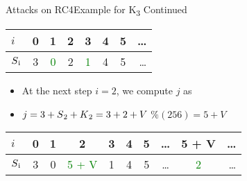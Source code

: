 \documentclass[
	aspectratio=169,	%
	onlytextwidth,		%
	t,					%
	]{beamer}
\begin{document}
\begin{frame}[fragile]{Attacks on RC4}{Example for K\textsubscript{3} Continued}

	\begin{table}[h!]
		\begin{center}
			\begin{tabular}{l|c|c|c|c|c|c|r}
			$i$ & 0 & 1 & 2 & 3 & 4 & 5 & \dots\\
			\hline
			$S\textsubscript{i}$ & 3 & \textcolor{green}{0} & 2 & \textcolor{green}{1} & 4 & 5 & \dots\\
			\end{tabular}
		\end{center}
	\end{table}

	\begin{itemize}
		\item At the next step $i = 2$, we compute $j$ as
		\item $j = 3 + S\textsubscript{2} + K\textsubscript{2} = 3 + 2 + V$ $\% (256) = 5+V$
	\end{itemize}

	\begin{table}[h!]
		\begin{center}
			\begin{tabular}{l|c|c|c|c|c|c|c|c|r}
			$i$ & 0 & 1 & 2 & 3 & 4 & 5 & \dots & 5 + V & \dots\\
			\hline
			$S\textsubscript{i}$ & 3 & 0 & \textcolor{green}{5 + V} & 1 & 4 & 5 & \dots & \textcolor{green}{2} & \dots\\
			\end{tabular}
		\end{center}
	\end{table}

\end{frame}
\end{document}
